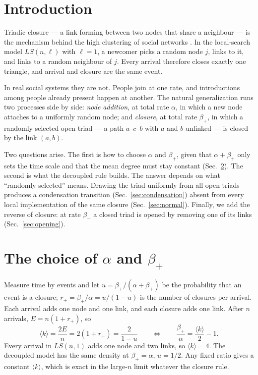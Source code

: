 \documentclass[aps,pre,twocolumn,superscriptaddress,floatfix,nofootinbib]{revtex4-2}
\begin{document}
\section{Introduction}

Triadic closure --- a link forming between two nodes that share a neighbour ---
is the mechanism behind the high clustering of social networks
\cite{granovetter1973,davidsen2002,holme2002,vazquez2003,toivonen2006,jackson2007}.
In the local-search model $LS(n,\ell)$ \cite{vazquez2001,vazquez2003,book} with
$\ell=1$, a newcomer picks a random node $j$, links to it, and links to a random
neighbour of $j$. Every arrival therefore closes exactly one triangle, and
arrival and closure are the same event.

In real social systems they are not. People join at one rate, and introductions
among people already present happen at another. The natural generalization runs
two processes side by side: \emph{node addition}, at total rate $\alpha$, in
which a new node attaches to a uniformly random node; and \emph{closure}, at
total rate $\beta_+$, in which a randomly selected open triad
--- a path $a$--$c$--$b$ with $a$ and $b$ unlinked --- is closed by the link
$(a,b)$.

Two questions arise. The first is how to choose $\alpha$ and $\beta_+$, given that
$\alpha+\beta_+$ only sets the time scale and that the mean degree must stay
constant (Sec.~\ref{sec:rates}). The second is what the decoupled rule builds.
The answer depends on what ``randomly selected'' means. Drawing the triad
uniformly from all open triads produces a condensation transition
(Sec.~\ref{sec:condensation}) absent from every local implementation of the same
closure (Sec.~\ref{sec:normal}). Finally, we add the reverse of closure: at rate
$\beta_-$ a closed triad is opened by removing one of its links
(Sec.~\ref{sec:opening}).

\section{The choice of $\alpha$ and $\beta_+$}
\label{sec:rates}

Measure time by events and let $u=\beta_+/(\alpha+\beta_+)$ be the probability that
an event is a closure; $r_+=\beta_+/\alpha=u/(1-u)$ is the number of closures per
arrival. Each arrival adds one node and one link, and each closure adds one
link. After $n$ arrivals, $E=n(1+r_+)$, so
\begin{equation}
  \langle k\rangle=\frac{2E}{n}=2(1+r_+)=\frac{2}{1-u}
  \qquad\Leftrightarrow\qquad
  \frac{\beta_+}{\alpha}=\frac{\langle k\rangle}{2}-1 .
  \label{eq:kmean}
\end{equation}
Every arrival in $LS(n,1)$ adds one node and two links, so $\langle k\rangle=4$.
The decoupled model has the same density at $\beta_+=\alpha$, $u=1/2$. Any fixed
ratio gives a constant $\langle k\rangle$, which is exact in the large-$n$ limit
whatever the closure rule.
\end{document}
